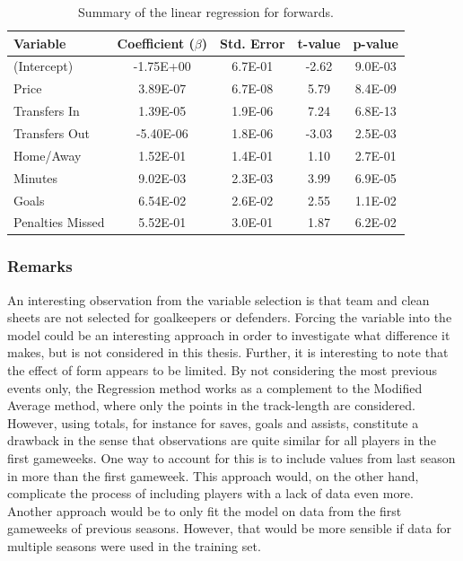 \begin{table}[!htb]
\centering
\begin{tabular}{|l|c|c|c|c|}
\hline
Variable         & Coefficient ($\beta$)  & Std. Error & t-value & p-value \\ \hline
(Intercept)  \Tstrut     & -1.75E+00 & 6.7E-01    & -2.62   & 9.0E-03 \\
Price            & 3.89E-07  & 6.7E-08    & 5.79    & 8.4E-09 \\
Transfers In     & 1.39E-05  & 1.9E-06    & 7.24    & 6.8E-13 \\
Transfers Out    & -5.40E-06 & 1.8E-06    & -3.03   & 2.5E-03 \\
Home/Away        & 1.52E-01  & 1.4E-01    & 1.10    & 2.7E-01 \\
Minutes          & 9.02E-03  & 2.3E-03    & 3.99    & 6.9E-05 \\
Goals            & 6.54E-02  & 2.6E-02    & 2.55    & 1.1E-02 \\
Penalties Missed \Bstrut & 5.52E-01  & 3.0E-01    & 1.87    & 6.2E-02 \\
\hline
\end{tabular}
\caption{Summary of the linear regression for forwards.}
\label{tab:coef_FWD}
\end{table}

\subsubsection{Remarks}

An interesting observation from the variable selection is that team and clean sheets are not selected for goalkeepers or defenders. Forcing the variable into the model could be an interesting approach in order to investigate what difference it makes, but is not considered in this thesis. Further, it is interesting to note that the effect of form appears to be limited. By not considering the most previous events only, the Regression method works as a complement to the Modified Average method, where only the points in the track-length are considered. However, using totals, for instance for saves, goals and assists, constitute a drawback in the sense that observations are quite similar for all players in the first gameweeks. One way to account for this is to include values from last season in more than the first gameweek. This approach would, on the other hand, complicate the process of including players with a lack of data even more. Another approach would be to only fit the model on data from the first gameweeks of previous seasons. However, that would be more sensible if data for multiple seasons were used in the training set.


